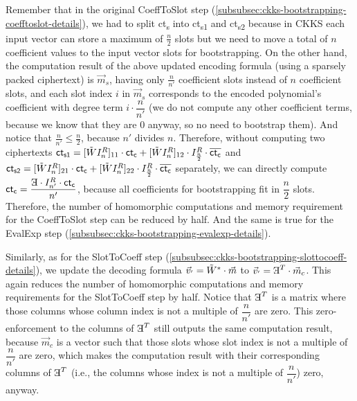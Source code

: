 Remember that in the original \textsf{CoeffToSlot} step (\autoref{subsubsec:ckks-bootstrapping-coefftoslot-details}), we had to split \textsf{ct\textsubscript{s}} into \textsf{ct\textsubscript{s1}} and \textsf{ct\textsubscript{s2}} because in CKKS each input vector can store a maximum of $\frac{n}{2}$ slots but we need to move a total of $n$ coefficient values to the input vector slots for bootstrapping. On the other hand, the computation result of the above updated encoding formula (using a sparsely packed ciphertext) is $\vec{m}_s$, having only $\frac{n}{n'}$ coefficient slots instead of $n$ coefficient slots, and each slot index $i$ in $\vec{m}_s$ corresponds to the encoded polynomial's coefficient with degree term $i \cdot \dfrac{n}{n'}$ (we do not compute any other coefficient terms, because we know that they are 0 anyway, so no need to bootstrap them). And notice that $\frac{n}{n'} \leq \frac{n}{2}$, because $n'$ divides $n$. Therefore, without computing two ciphertexts $\textsf{ct}_{\textsf{s1}} = [\tilde WI_n^R]_{11} \cdot \textsf{ct\textsubscript{c}} + [\tilde WI_n^R]_{12} \cdot I_{\frac{n}{2}}^R \cdot \mathit{\overline{\textsf{ct\textsubscript{c}}}}$ and $\textsf{ct}_{\textsf{s2}} = [\tilde WI_n^R]_{21} \cdot \textsf{ct\textsubscript{c}} + [\tilde WI_n^R]_{22} \cdot I_{\frac{n}{2}}^R \cdot \mathit{\overline{\textsf{ct\textsubscript{c}}}}$ separately, we can directly compute $\textsf{ct\textsubscript{c}} = \dfrac{ \text{\rotatecharone{E}} \cdot I_{n'}^R \cdot \textsf{ct\textsubscript{c}}}{n'}$, because all coefficients for bootstrapping fit in $\dfrac{n}{2}$ slots. Therefore, the number of homomorphic computations and memory requirement for the \textsf{CoeffToSlot} step can be reduced by half. And the same is true for the \textsf{EvalExp} step (\autoref{subsubsec:ckks-bootstrapping-evalexp-details}).

Similarly, as for the \textsf{SlotToCoeff} step (\autoref{subsubsec:ckks-bootstrapping-slottocoeff-details}), we update the decoding formula $\vec{v}_{'} = \tilde W^* \cdot \vec{m}$ to $\vec{v}_{'} = \text{\rotatecharone{E}}^{T} \cdot \vec{m}_c$. This again reduces the number of homomorphic computations and memory requirements for the \textsf{SlotToCoeff} step by half. Notice that $\text{\rotatecharone{E}}^{T}$ is a matrix where those columns whose column index is not a multiple of $\dfrac{n}{n'}$ are zero. This zero-enforcement to the columns of $\text{\rotatecharone{E}}^{T}$ still outputs the same computation result, because $\vec{m}_c$ is a vector such that those slots whose slot index is not a multiple of $\dfrac{n}{n'}$ are zero, which makes the computation result with their corresponding columns of $\text{\rotatecharone{E}}^{T}$ (i.e., the columns whose index is not a multiple of $\dfrac{n}{n'}$) zero, anyway.



